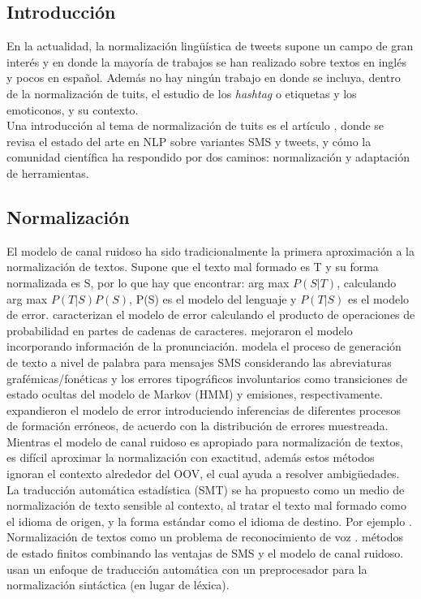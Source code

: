 \documentclass[spanish,12pt, a4paper,twoside]{paper}
\begin{document}
\subsection{Introducción}\label{sec:introduccion}
En la actualidad, la normalización lingüística de tweets \cite{baldwin:2011} supone un campo de gran interés y en donde la mayoría de trabajos se han realizado sobre textos en inglés y pocos en español. Además no hay ningún trabajo en donde se incluya, dentro de la normalización de tuits, el estudio de los \textit{hashtag} o etiquetas y los emoticonos, y su contexto. \\
Una introducción al tema de normalización de tuits es el artículo \cite{eisenstein:2013}, donde se revisa el estado del arte en NLP sobre variantes SMS y tweets, y cómo la comunidad científica ha respondido por dos caminos: normalización y adaptación de herramientas.
\subsection{Normalización}\label{sec:normalizacion}
El modelo de canal ruidoso \cite{shannon:1948} ha sido tradicionalmente la primera aproximación a la normalización de textos. Supone que el texto mal formado es T y su forma normalizada es S, por lo que hay que encontrar: arg max $P(S|T)$, calculando arg max $P(T|S) P(S)$, P(S) es el modelo del lenguaje y $P(T|S)$ es el modelo de error. \cite{brillmoore:2000} caracterizan el modelo de error calculando el producto de operaciones de probabilidad en partes de cadenas de caracteres. \cite{toutanovamoore:2002} mejoraron el modelo incorporando información de la pronunciación. \cite{choudhury:2007} modela el proceso de generación de texto a nivel de palabra para mensajes SMS considerando las abreviaturas grafémicas/fonéticas y los errores tipográficos involuntarios como transiciones de estado ocultas del modelo de Markov (HMM) y emisiones, respectivamente. \cite{cookstevenson:2009} expandieron el modelo de error introduciendo inferencias de diferentes procesos de formación erróneos, de acuerdo con la distribución de errores muestreada.\\

Mientras el modelo de canal ruidoso es apropiado para normalización de textos, es difícil aproximar la normalización con exactitud, además estos métodos ignoran el contexto alrededor del OOV, el cual ayuda a resolver ambigüedades. La traducción automática estadística (SMT) se ha propuesto como un medio de normalización de texto sensible al contexto, al tratar el texto mal formado como el idioma de origen, y la forma estándar como el idioma de destino. Por ejemplo \cite{aw:2006}. Normalización de textos como un problema de reconocimiento de voz \cite{kobus:2008}. \cite{beaufort:2002} métodos de estado finitos combinando las ventajas de SMS y el modelo de canal ruidoso. \cite{kaufmannkalita:2010} usan un enfoque de traducción automática con un preprocesador para la normalización sintáctica (en lugar de léxica).\\
\end{document}
